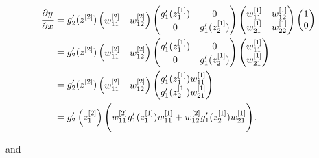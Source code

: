 \documentclass{article}
\begin{document}
\begin{align}
\frac{\partial y}{\partial x} &= g_2'(z^{[2]})
\begin{pmatrix}
w_{11}^{[2]} & w_{12}^{[2]} 
\end{pmatrix}
\begin{pmatrix}
g_1'(z_1^{[1]}) & 0 \\
0 & g_1'(z_2^{[1]})
\end{pmatrix}
\begin{pmatrix}
w_{11}^{[1]} & w_{12}^{[1]} \\
w_{21}^{[1]} & w_{22}^{[1]}
\end{pmatrix}
\begin{pmatrix}
1 \\
0
\end{pmatrix}  \\
&= g_2'(z^{[2]})
\begin{pmatrix}
w_{11}^{[2]} & w_{12}^{[2]} 
\end{pmatrix}
\begin{pmatrix}
g_1'(z_1^{[1]}) & 0 \\
0 & g_1'(z_2^{[1]})
\end{pmatrix}
\begin{pmatrix}
w_{11}^{[1]}  \\
w_{21}^{[1]}
\end{pmatrix} \\
&= g_2'(z^{[2]})
\begin{pmatrix}
w_{11}^{[2]} & w_{12}^{[2]} 
\end{pmatrix}
\begin{pmatrix}
g_1'(z_1^{[1]}) w_{11}^{[1]} \\
g_1'(z_2^{[1]}) w_{21}^{[1]}
\end{pmatrix} \\
&= g_2'\left(z_1^{[2]}\right)\Bigg{(} w_{11}^{[2]} g_1'(z_1^{[1]})w_{11}^{[1]} + w_{12}^{[2]}g_1'(z_2^{[1]})w_{21}^{[1]} \Bigg{)}.
\end{align}

and
\end{document}
